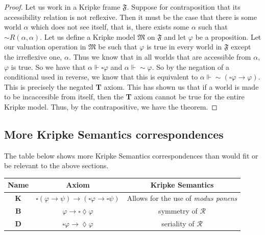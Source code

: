 \documentclass[12pt]{article}
\renewcommand{\phi}{\varphi}
\DeclareMathOperator{\forces}{\Vdash}
\begin{document}
\begin{proof}
    Let us work in a Kripke frame $\mathfrak{F}$. Suppose for contraposition that its accessibility relation is not reflexive. Then it must be
    the case that there is some world $\alpha$ which does not see itself, that is, there exists some $\alpha$ such that $\sim \! \! R(\alpha, \alpha)$.
    Let us define a Kripke model $\mathfrak{M}$ on $\mathfrak{F}$ and let $\phi$ be a proposition. Let our valuation operation in $\mathfrak{M}$
    be such that $\phi$ is true in every world in $\mathfrak{F}$ except the irreflexive one, $\alpha$. Thus we know that in all worlds that are
    accessible from $\alpha$, $\phi$ is true. So we have that $\alpha \forces \square \phi$ and $\alpha \forces \sim \! \! \phi$. So by the
    negation of a conditional used in reverse, we know that this is equivalent to $\alpha \forces \sim \! \! (\square \phi \rightarrow \phi)$. 
    This is precisely the negated \textbf{T} axiom. This has shown us that if a world is made to be incaccesible from itself, then the \textbf{T} axiom
    cannot be true for the entire Kripke model. Thus, by the contrapositive, we have the theorem.
\end{proof}

\subsection{More Kripke Semantics correspondences}
The table below shows more Kripke Semantics correspondences than would fit or be relevant to the above sections.

\bigskip
\centering
\begin{tabular}{| c | c | c |}
    \hline
    Name & Axiom & Kripke Semantics \\
    \hline
    \textbf{K} & $\square (\phi \rightarrow \psi ) \rightarrow (\square \phi \rightarrow \square \psi)$ & Allows for the use of \emph{modus ponens} \\
    \hline
    \textbf{B} & $\phi \rightarrow \square \lozenge \phi$ & symmetry of $\mathcal{R}$ \\
    \hline
    \textbf{D} & $\square \phi \rightarrow \lozenge \phi$ & seriality of $\mathcal{R}$ \\
    \hline
\end{tabular}
\end{document}
